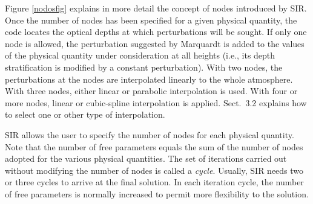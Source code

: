 \documentclass[11pt]{report}
\begin{document}
Figure \ref{nodosfig} explains in more detail the concept of nodes
introduced by SIR. Once the number of nodes has been specified for a
given physical quantity, the code locates the optical depths at which
perturbations will be sought. If only one node is allowed, the
perturbation suggested by Marquardt is added to the values of the
physical quantity under consideration at all heights (i.e., its depth
stratification is modified by a constant perturbation). With two nodes, the
perturbations at the nodes are interpolated linearly to the whole
atmosphere.  With three nodes, either linear or parabolic interpolation 
is used. With four or more nodes, linear or cubic-spline interpolation 
is applied. Sect.\ 3.2 explains how to select one or other type of
interpolation.

SIR allows the user to specify the number of nodes for each physical
quantity. Note that the number of free parameters equals the sum of the
number of nodes adopted for the various physical quantities. The set of
iterations carried out without modifying the number of nodes is called a
{\em cycle}. Usually, SIR needs two or three cycles to arrive at the final
solution. In each iteration cycle, the number of free parameters is normally 
increased to permit more flexibility to the solution.
\end{document}
